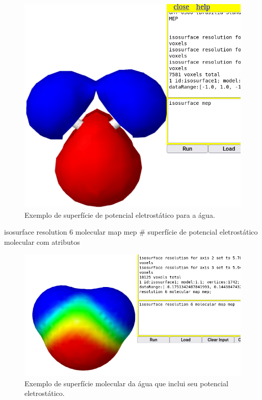 \documentclass[
  letterpaper,
  DIV=11,
  numbers=noendperiod]{scrreprt}
\newenvironment{Shaded}{\begin{snugshade}}{\end{snugshade}}
\newcommand{\CommentTok}[1]{\textcolor[rgb]{0.37,0.37,0.37}{#1}}
\newcommand{\DecValTok}[1]{\textcolor[rgb]{0.68,0.00,0.00}{#1}}
\newcommand{\NormalTok}[1]{\textcolor[rgb]{0.00,0.23,0.31}{#1}}
\begin{document}
\begin{figure}[H]

{\centering \includegraphics{isosurfMep.png}

}

\caption{Exemplo de superfície de potencial eletrostático para a água.}

\end{figure}%

\begin{Shaded}
\begin{Highlighting}[]
\NormalTok{isosurface resolution }\DecValTok{6}\NormalTok{ molecular map mep }\CommentTok{\# superfície de potencial eletrostático molecular com atributos}
\end{Highlighting}
\end{Shaded}

\begin{figure}[H]

{\centering \includegraphics{isosurfFull.png}

}

\caption{Exemplo de superfície molecular da água que inclui seu
potencial eletrostático.}

\end{figure}%
\end{document}
